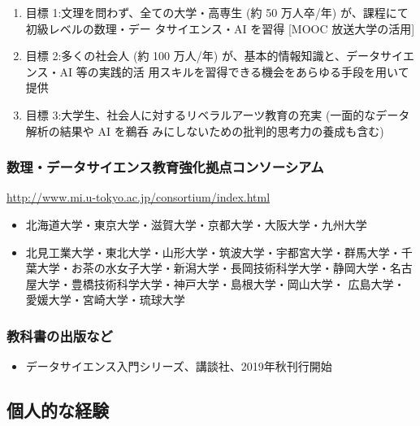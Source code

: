\documentclass[
]{book}
\providecommand{\tightlist}{%
  \setlength{\itemsep}{0pt}\setlength{\parskip}{0pt}}
\theoremstyle{definition}
\theoremstyle{definition}
\theoremstyle{definition}
\theoremstyle{definition}
\theoremstyle{remark}
\begin{document}
\begin{enumerate}
\def\labelenumi{\arabic{enumi}.}
\item
  目標 1:文理を問わず、全ての大学・高専生 (約 50 万人卒/年) が、課程にて初級レベルの数理・デー タサイエンス・AI を習得 {[}MOOC 放送大学の活用{]}
\item
  目標 2:多くの社会人 (約 100 万人/年) が、基本的情報知識と、データサイエンス・AI 等の実践的活 用スキルを習得できる機会をあらゆる手段を用いて提供
\item
  目標 3:大学生、社会人に対するリベラルアーツ教育の充実 (一面的なデータ解析の結果や AI を鵜呑 みにしないための批判的思考力の養成も含む)
\end{enumerate}

\hypertarget{ux6570ux7406ux30c7ux30fcux30bfux30b5ux30a4ux30a8ux30f3ux30b9ux6559ux80b2ux5f37ux5316ux62e0ux70b9ux30b3ux30f3ux30bdux30fcux30b7ux30a2ux30e0}{%
\subsubsection{数理・データサイエンス教育強化拠点コンソーシアム}\label{ux6570ux7406ux30c7ux30fcux30bfux30b5ux30a4ux30a8ux30f3ux30b9ux6559ux80b2ux5f37ux5316ux62e0ux70b9ux30b3ux30f3ux30bdux30fcux30b7ux30a2ux30e0}}

\url{http://www.mi.u-tokyo.ac.jp/consortium/index.html}

\begin{itemize}
\item
  北海道大学・東京大学・滋賀大学・京都大学・大阪大学・九州大学
\item
  北見工業大学・東北大学・山形大学・筑波大学・宇都宮大学・群馬大学・千葉大学・お茶の水女子大学・新潟大学・長岡技術科学大学・静岡大学・名古屋大学・豊橋技術科学大学・神戸大学・島根大学・岡山大学・ 広島大学・愛媛大学・宮崎大学・琉球大学
\end{itemize}

\hypertarget{ux6559ux79d1ux66f8ux306eux51faux7248ux306aux3069}{%
\subsubsection{教科書の出版など}\label{ux6559ux79d1ux66f8ux306eux51faux7248ux306aux3069}}

\begin{itemize}
\tightlist
\item
  データサイエンス入門シリーズ、講談社、2019年秋刊行開始
\end{itemize}

\hypertarget{ux500bux4ebaux7684ux306aux7d4cux9a13}{%
\subsection{個人的な経験}\label{ux500bux4ebaux7684ux306aux7d4cux9a13}}
\end{document}
